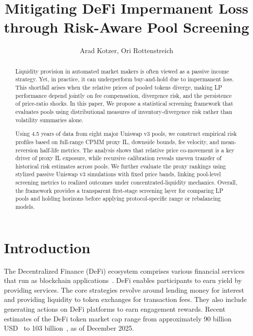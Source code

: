 \documentclass[anonymous]{lipics-v2021}
\title{Mitigating DeFi Impermanent Loss through Risk-Aware Pool Screening}
\author{Arad Kotzer, Ori Rottenstreich}{Department of Computer Science, The Technion, [optional: Address], Israel}{}{}{}
\begin{document}
\maketitle

\begin{abstract}
Liquidity provision in automated market makers is often viewed as a passive income strategy. Yet, in practice, it can underperform buy-and-hold due to impermanent loss. 
This shortfall arises when the relative prices of pooled tokens diverge, making LP performance depend jointly on fee compensation, divergence risk, and the persistence of price-ratio shocks. In this paper,  We propose a statistical screening framework that evaluates pools using distributional measures of inventory-divergence risk rather than volatility summaries alone.

Using 4.5 years of data from eight major Uniswap v3 pools, we construct empirical risk profiles based on full-range CPMM proxy IL, downside bounds, fee velocity, and mean-reversion half-life metrics. 
The analysis shows that relative price co-movement is a key driver of proxy IL exposure, while recursive calibration reveals uneven transfer of historical risk estimates across pools. 
We further evaluate the proxy rankings using stylized passive Uniswap v3 simulations with fixed price bands, linking pool-level screening metrics to realized outcomes under concentrated-liquidity mechanics.
Overall, the framework provides a transparent first-stage screening layer for comparing LP pools and holding horizons before applying protocol-specific range or rebalancing models.
\end{abstract}




\section{Introduction}

The Decentralized Finance (DeFi) ecosystem comprises various financial services that run as blockchain applications~\cite{schar2021decentralized, zetzsche2020decentralized, jensen2021introduction, Bitcoin, wood2014ethereum}. DeFi enables participants to earn yield by providing services. The core strategies revolve around lending money for interest and providing liquidity to token exchanges for transaction fees. They also include generating actions on DeFi platforms to earn engagement rewards. Recent estimates of the DeFi token market cap range from approximately 90 billion USD~\cite{forbes2025defi} to 103 billion~\cite{coingecko2025defi}, as of December 2025.
\end{document}
